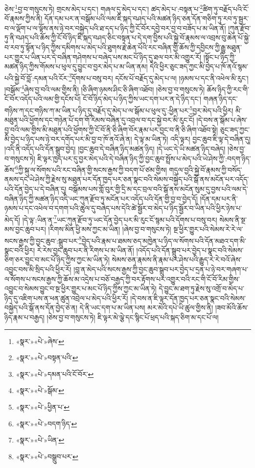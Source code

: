 ཅེས་\footnote{«སྣར་»«པེ་»ཞེས་}བྱ་བ་གསུངས་ཏེ། གྲངས་མེད་པ་དང་། གཞལ་དུ་མེད་པ་དང་། ཚད་མེད་པ་:བསྟན་པ་\footnote{«སྣར་»«པེ་»བསྟན་པའི་}ཚིག་ཏུ་བརྗོད་པའི་ངོ་བོ་རྣམས་ཀྱིས་ནི། དོན་དམ་པར་ན་བསྒོམ་པའི་ལམ་ཇི་སྐད་བཤད་པའི་མཚན་ཉིད་ཅན་དོན་གཅིག་ཏུ་རབ་ཏུ་སྦྱར་བ་ལ་ལྡོག་པ་ལ་ལྟོས་ནས་ཉེ་བར་བསྐྱེད་པའི་ཐ་དད་པ་ཉིད་ཀྱི་ངོ་བོར་དབྱེ་བར་བྱ་བ་བཟོད་པ་མ་ཡིན་ནོ། །ཀུན་རྫོབ་ཏུ་ནི་བཤད་པའི་ཆོས་ཀྱི་ངོ་བོ་ཉིད་ཇི་སྐད་བཤད་ཅིང་བསྟན་པ་དེ་དག་བྱིས་པའི་སྐྱེ་བོ་རྣམས་ལ་འབྲས་བུ་ཆེན་པོ་སྐྱེ་བ་རབ་ཏུ་སྟོན་པ་ཉིད་ཀྱིས་དམིགས་པ་མེད་པའི་ཐུགས་རྗེ་ཆེན་པོའི་རང་བཞིན་གྱི་ཆོས་ཀྱི་དབྱིངས་ཀྱི་རྒྱུ་མཐུན་པར་གྱུར་པ་ཡིན་པར་དེ་བཞིན་གཤེགས་པ་བཞེད་པས་མང་པོ་ཉིད་དུ་ཐལ་བར་མི་འགྱུར་རོ། །སྟོང་པ་ཉིད་ཀྱི་མཚན་ཉིད་ཀྱིས་གོམས་པ་ཕུལ་དུ་བྱུང་བ་བྱར་མེད་པ་མ་ཡིན་ནམ། དེའི་ཕྱིར་ཅུང་ཟད་ཀྱང་མི་བྱེད་པ་ཁོ་ནའོ་སྙམ་པའི་སྐྱེ་བོ་བློ་:དམན་པའི་ངོར་\footnote{«སྣར་»«པེ་»དམན་པའི་ངོ་བོར་}དོགས་པ་བསུ་བར། དངོས་པོ་བརྗོད་དུ་མེད་པ་ལ། །ཉམས་པ་དང་ནི་འཕེལ་མི་རུང་། །བསྒོམ་\footnote{«སྣར་»«པེ་»སྒོམ་}ཞེས་བྱ་བའི་ལམ་གྱིས་ནི། །ཅི་ཞིག་ཉམས་ཤིང་ཅི་ཞིག་འཐོབ། །ཅེས་བྱ་བ་གསུངས་ཏེ། ཆོས་ཉིད་ཀྱི་རང་གི་ངོ་བོར་འདོད་པའི་ལམ་གྱི་དངོས་པོ། ངོ་བོ་ཉིད་མེད་པ་ཉིད་ཀྱིས་ཡང་དག་པར་ན་དེ་ཉིད་དང་། གཞན་ཉིད་དང་གཉིས་ཀ་དང་གཉིས་ཀ་མ་ཡིན་པ་ཉིད་དུ་བརྗོད་དུ་མེད་པ་ལ་སྒོམ་པ་ཕུལ་དུ་:ཕྱིན་པར་\footnote{«སྣར་»«པེ་»ཕྱིན་པ་}བྱར་མེད་པའི་ཕྱིར། མི་མཐུན་པའི་ཕྱོགས་དང་གཉེན་པོ་དག་གོ་རིམས་བཞིན་དུ་འབྲལ་བ་དང་སྐྱེ་བར་མི་རུང་ངོ། །དེ་བས་ན་སྒོམ་པ་ཞེས་བྱ་བའི་ལམ་གྱིས་མི་མཐུན་པའི་ཕྱོགས་ཀྱི་ངོ་བོ་ནི་ཅི་ཞིག་བོར་རྣམ་པར་བྱང་བ་ནི་ཅི་ཞིག་འཐོབ་སྟེ། ཅུང་ཟད་ཀྱང་མི་བྱེད་པ་ཉིད་པས་ཉེ་བར་དགོད་པར་མི་བྱ་བ་ཁོ་ནའོ་ཞེ་ན། དེ་ལྟ་མ་ཡིན་ཏེ། འདི་ལྟར། བྱང་ཆུབ་ཇི་ལྟ་དེ་བཞིན་དུ། །འདི་ནི་འདོད་པའི་དོན་སྒྲུབ་བྱེད། །བྱང་ཆུབ་དེ་བཞིན་ཉིད་མཚན་ཉིད། །དེ་ཡང་དེ་ཡི་མཚན་ཉིད་བཞེད། །ཅེས་བྱ་བ་གསུངས་ཏེ། ཇི་ལྟར་ཁྱད་པར་དུ་བྱར་མེད་པའི་དེ་བཞིན་ཉིད་ཀྱི་བྱང་ཆུབ་སྤྲོས་པ་མེད་པའི་ཡེ་ཤེས་ཀྱི་:བདག་ཉིད་ཆོས་\footnote{«སྣར་»«པེ་»བདག་ཉིད་}ཀྱི་སྐུ་ལ་སོགས་པའི་རང་བཞིན་གྱི་སངས་རྒྱས་ཀྱི་བདག་པོ་ཙམ་གྱིས། གདུལ་བྱའི་སྐྱེ་བོ་རྣམས་ཀྱི་བསོད་ནམས་དང་ཡེ་ཤེས་ཀྱི་རྗེས་སུ་མཐུན་པར་དོན་ཁྱད་པར་ཅན་སྣང་བའི་སེམས་བསྐྱེད་པའི་སྒོ་ནས་མངོན་པར་འདོད་པའི་དོན་བྱེད་པ་དེ་བཞིན་དུ། བསྒོམས་པས་གློ་བུར་གྱི་དྲི་མ་དང་བྲལ་བའི་སྒོ་ནས་མངོན་སུམ་དུ་བྱས་པའི་ལམ་དེ་བཞིན་ཉིད་ཀྱི་མཚན་ཉིད་འདི་ཡང་ཀུན་རྫོབ་ཏུ་མངོན་པར་འདོད་པའི་དོན་གྱི་བྱ་བ་བྱེད་དོ། །དོན་དམ་པར་ནི་ཉམས་པ་དང་འཕེལ་བ་དགག་པའི་ཚུལ་དུ་བཞེད་པས་དེའི་ཚེ་སྦྱོར་བ་མེད་པ་ཉིད་སྦྱོར་བ་ཡིན་པའི་ཕྱིར་ཉེས་པ་མེད་དོ། །དེ་ལྟ་:ཡིན་ན་\footnote{«སྣར་»«པེ་»ཡིན་}ཡང་ཀུན་རྫོབ་ཏུ་ཡང་དོན་བྱེད་པར་མི་རུང་ངོ་སྙམ་པའི་དོགས་པ་བསུ་བར། སེམས་ནི་སྔ་མས་བྱང་ཆུབ་པར། །རིགས་མིན་ཕྱི་མས་ཀྱང་མ་ཡིན། །ཞེས་བྱ་བ་གསུངས་ཏེ། སྔ་ཕྱིར་གྱུར་པའི་སེམས་རེ་རེ་ལ་སངས་རྒྱས་ཀྱི་བྱང་ཆུབ་:སྒྲུབ་པར་\footnote{«སྣར་»«པེ་»བསྒྲུབ་པར་}བྱེད་པའི་རྣམ་པ་ཐམས་ཅད་མཁྱེན་པ་ཉིད་ལ་སོགས་པའི་དོན་མཐའ་དག་མི་སྣང་བའི་ཕྱིར། རེ་རེས་བྱང་ཆུབ་པར་ནི་རིགས་པ་མ་ཡིན་ནོ། །འདོད་པའི་དོན་སྒྲུབ་པར་བྱེད་པ་སྣང་བའི་སེམས་ཅིག་ཅར་བྱུང་བ་མང་པོ་ཉིད་ཀྱིས་ཀྱང་མ་ཡིན་ཏེ། སེམས་ཅན་རྣམས་ནི་རྣམ་པར་ཤེས་པའི་རྒྱུད་རེ་རེ་བའོ་ཞེས་འབྱུང་བས་མི་སྲིད་པའི་ཕྱིར་རོ། །བླ་ན་མེད་པའི་སངས་རྒྱས་ཀྱི་བྱང་ཆུབ་སྒྲུབ་པར་བྱེད་པ་དྲན་པ་ཉེ་བར་གཞག་པ་ལ་སོགས་པ་སངས་རྒྱས་ཀྱི་ཆོས་མ་འདྲེས་པ་བཅོ་བརྒྱད་ཀྱི་བར་རྟོགས་པར་འགྱུར་བའི་རང་གི་ངོ་བོ་རིམ་གྱིས་འབྱུང་བ་སེམས་བྱུང་བ་སྔ་ཕྱིར་གྱུར་པ་མང་པོ་ཉིད་ཀྱིས་ཀྱང་མ་ཡིན་ཏེ། དེ་བྱུང་མ་ཐག་ཏུ་རྗེས་སུ་འགྲོ་བ་མེད་པ་ཉིད་དུ་འཇིག་པས་ན་ཕན་ཚུན་འབྲེལ་པ་མེད་པའི་ཕྱིར་རོ། །དེ་བས་ན་ཇི་ལྟར་དོན་ཁྱད་པར་ཅན་སྣང་བའི་སེམས་བསྐྱེད་པའི་སྒོ་ནས་དོན་བྱེད་ཅེ་ན། དེ་ནི་ཡང་དག་པ་མ་ཡིན་པས། མར་མེའི་དཔེ་ཡི་ཚུལ་གྱིས་ནི། །ཟབ་མོའི་ཆོས་ཉིད་རྣམ་པ་བརྒྱད། །ཅེས་བྱ་བ་གསུངས་ཏེ། ཇི་ལྟར་མེ་ལྕེ་དང་སྙིང་པོ་ཕྲད་པའི་སྐད་ཅིག་མ་དང་པོ་ལ། 
